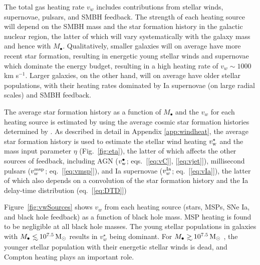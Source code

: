 \documentclass[usenatbib,fleqn]{mn2e}
\newcommand\lsim{\mathrel{\rlap{\lower4pt\hbox{\hskip1pt$\sim$}}
    \raise1pt\hbox{$<$}}}
\newcommand\gsim{\mathrel{\rlap{\lower4pt\hbox{\hskip1pt$\sim$}}
    \raise1pt\hbox{$>$}}}
\newcommand{\Mbh}[1][]{M_{\bullet#1}}
\newcommand{\vwO}{v_{w}}
\begin{document}
The total gas heating rate $\vwO$ includes contributions from stellar winds, supernovae, pulsars, and SMBH feedback.  The strength of each heating source will depend on the SMBH mass and the star formation history in the galactic nuclear region, the latter of which will vary systematically with the galaxy mass and hence with $\Mbh$.  Qualitatively, smaller galaxies will on average have more recent star formation, resulting in energetic young stellar winds and supernovae which dominate the energy budget, resulting in a high heating rate of $\vwO \sim 1000 $ km s$^{-1}$.  Larger galaxies, on the other hand, will on average have older stellar populations, with their heating rates dominated by Ia supernovae (on large radial scales) and SMBH feedback.

The average star formation history as a function of $\Mbh$ and the $\vwO$ for each heating source is estimated by using the average cosmic star formation histories determined by \citet{MosterNaab+:2013a}.  As described in detail in Appendix \ref{app:windheat}, the average star formation history is used to estimate the stellar wind heating $v_{\rm w}^{\star}$ and the mass input parameter $\eta$ (Fig.~\ref{fig:eta}), the latter of which affects the other sources of feedback, including AGN ($v_{\rm w}^{\bullet}$; eqs.~[\ref{eq:vC}], [\ref{eq:vjet}]), millisecond pulsars ($v_{w}^{\rm msp}$; eq.~[\ref{eq:vmsp}]), and Ia supernovae ($v_{w}^{\rm Ia}$; eq.~[\ref{eq:vIa}]), the latter of which also depends on a convolution of the star formation history and the Ia delay-time distribution (eq.~[\ref{eq:DTD}])

Figure~\ref{fig:vwSources} shows $\vwO$ from each heating source (stars, MSPs, SNe Ia, and black hole
feedback) as a function of black hole mass.  MSP heating is found to be negligible at all black hole masses.  The young stellar populations in galaxies with $\Mbh\lsim 10^{7.5} \Msun$ results in $v_{w}^{\star}$ being dominant.  For $\Mbh\gsim 10^{7.5} \Msun$ , the younger stellar population with their energetic
stellar winds is dead, and Compton heating plays an important role.
\end{document}

